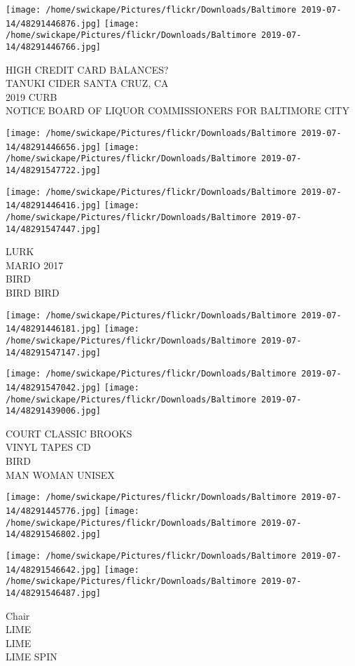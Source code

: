 \documentclass[10pt,letterpaper]{article}
\begin{document}
\texttt{[image: /home/swickape/Pictures/flickr/Downloads/Baltimore 2019-07-14/48291446876.jpg]}
\texttt{[image: /home/swickape/Pictures/flickr/Downloads/Baltimore 2019-07-14/48291446766.jpg]}

HIGH CREDIT CARD BALANCES?\\
TANUKI CIDER SANTA CRUZ, CA\\
2019 CURB\\
NOTICE BOARD OF LIQUOR COMMISSIONERS FOR BALTIMORE CITY
\pagebreak

\texttt{[image: /home/swickape/Pictures/flickr/Downloads/Baltimore 2019-07-14/48291446656.jpg]}
\texttt{[image: /home/swickape/Pictures/flickr/Downloads/Baltimore 2019-07-14/48291547722.jpg]}

\texttt{[image: /home/swickape/Pictures/flickr/Downloads/Baltimore 2019-07-14/48291446416.jpg]}
\texttt{[image: /home/swickape/Pictures/flickr/Downloads/Baltimore 2019-07-14/48291547447.jpg]}

LURK\\
MARIO 2017\\
BIRD\\
BIRD BIRD
\pagebreak

\texttt{[image: /home/swickape/Pictures/flickr/Downloads/Baltimore 2019-07-14/48291446181.jpg]}
\texttt{[image: /home/swickape/Pictures/flickr/Downloads/Baltimore 2019-07-14/48291547147.jpg]}

\texttt{[image: /home/swickape/Pictures/flickr/Downloads/Baltimore 2019-07-14/48291547042.jpg]}
\texttt{[image: /home/swickape/Pictures/flickr/Downloads/Baltimore 2019-07-14/48291439006.jpg]}

COURT CLASSIC BROOKS\\
VINYL TAPES CD\\
BIRD\\
MAN WOMAN UNISEX
\pagebreak

\texttt{[image: /home/swickape/Pictures/flickr/Downloads/Baltimore 2019-07-14/48291445776.jpg]}
\texttt{[image: /home/swickape/Pictures/flickr/Downloads/Baltimore 2019-07-14/48291546802.jpg]}

\texttt{[image: /home/swickape/Pictures/flickr/Downloads/Baltimore 2019-07-14/48291546642.jpg]}
\texttt{[image: /home/swickape/Pictures/flickr/Downloads/Baltimore 2019-07-14/48291546487.jpg]}

Chair\\
LIME\\
LIME\\
LIME SPIN
\pagebreak
\end{document}

